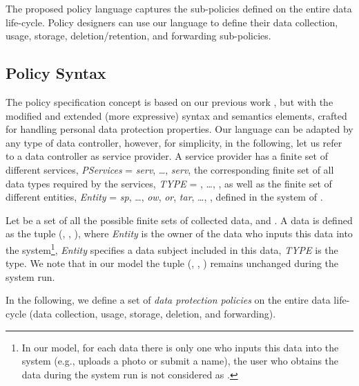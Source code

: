 \documentclass[a4paper]{article}
\begin{document}
The proposed policy language captures the sub-policies defined on the entire data life-cycle. Policy designers can use our language to define their data collection, usage, storage, deletion/retention, and forwarding sub-policies.  

        

\subsection{Policy Syntax}
\label{sec:syntaxpp}

The policy  specification concept is based on our previous work \cite{TaButin15}, but with the modified and extended (more expressive) syntax and semantics elements, crafted for handling personal data protection properties. 
Our language can be adapted by any type of data controller, however, for simplicity, in the following, let us refer to a data controller as service provider. A service provider  has a finite set of  different services, \textit{PServices} = \textit{serv}, \dots, \textit{serv}, the corresponding finite set of all data types required by the  services, \textit{TYPE} = , \dots, , as well as the finite set of different entities, \textit{Entity} = \textit{sp}, \dots, \textit{ow}, \textit{or}, \textit{tar}, \dots, ,  defined in the system of . 

Let  be a set of all the possible finite sets of collected data, and   . A data    is defined as the tuple (, , ), where   \textit{Entity} is the owner of the data who inputs this data into the system\footnote{In our model, for each data there is only one  who inputs this data into the system (e.g.,  uploads a photo or submit a name), the user who obtains the data during the system run is not considered as .},   \textit{Entity} specifies a data subject included in this data,   \textit{TYPE} is the type. We note that in our model the tuple (, , ) remains unchanged during the system run.  

In the following, we define a set of \textit{data protection policies} on the entire data life-cycle (data collection, usage, storage, deletion, and forwarding).    
\end{document}
